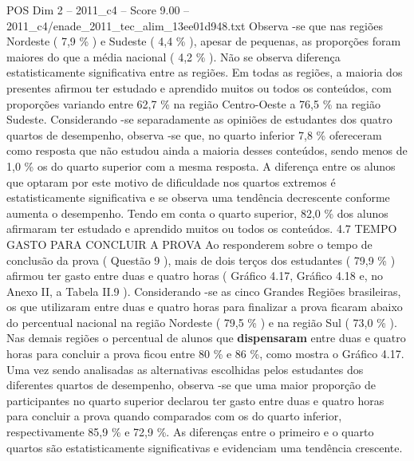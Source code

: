 \begin{textsample}{POS Dim 2 – 2011\_c4 – Score 9.00 – 2011\_c4/enade\_2011\_tec\_alim\_13ee01d948.txt}
Observa -se que nas regiões Nordeste ( 7,9 \% ) e Sudeste ( 4,4 \% ), apesar de pequenas, as proporções foram maiores do que a média nacional ( 4,2 \% ).
Não se observa diferença estatisticamente significativa entre as regiões.
Em todas as regiões, a maioria dos presentes afirmou ter estudado e aprendido muitos ou todos os conteúdos, com proporções variando entre 62,7 \% na região Centro-Oeste a 76,5 \% na região Sudeste.
Considerando -se separadamente as opiniões de estudantes dos quatro quartos de desempenho, observa -se que, no quarto inferior 7,8 \% ofereceram como resposta que não estudou ainda a maioria desses conteúdos, sendo menos de 1,0 \% os do quarto superior com a mesma resposta.
A diferença entre os alunos que optaram por este motivo de dificuldade nos quartos extremos é estatisticamente significativa e se observa uma tendência decrescente conforme aumenta o desempenho.
Tendo em conta o quarto superior, 82,0 \% dos alunos afirmaram ter estudado e aprendido muitos ou todos os conteúdos. 4.7 TEMPO GASTO PARA CONCLUIR A PROVA Ao responderem sobre o tempo de conclusão da prova ( Questão 9 ), mais de dois terços dos estudantes ( 79,9 \% ) afirmou ter gasto entre duas e quatro horas ( Gráfico 4.17, Gráfico 4.18 e, no Anexo II, a Tabela II.9 ).
Considerando -se as cinco Grandes Regiões brasileiras, os que utilizaram entre duas e quatro horas para finalizar a prova ficaram abaixo do percentual nacional na região Nordeste ( 79,5 \% ) e na região Sul ( 73,0 \% ).
Nas demais regiões o percentual de alunos que \textbf{dispensaram} entre duas e quatro horas para concluir a prova ficou entre 80 \% e 86 \%, como mostra o Gráfico 4.17.
Uma vez sendo analisadas as alternativas escolhidas pelos estudantes dos diferentes quartos de desempenho, observa -se que uma maior proporção de participantes no quarto superior declarou ter gasto entre duas e quatro horas para concluir a prova quando comparados com os do quarto inferior, respectivamente 85,9 \% e 72,9 \%.
As diferenças entre o primeiro e o quarto quartos são estatisticamente significativas e evidenciam uma tendência crescente.

\end{textsample}
